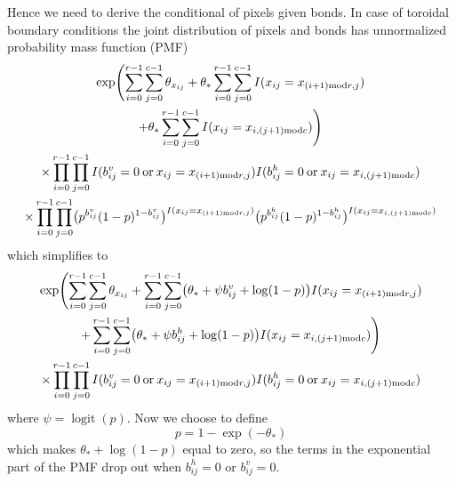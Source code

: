 \documentclass[11pt]{article}
\renewcommand{\mod}{\mathbin{\rm mod}}
\newcommand{\opor}{\mathbin{\rm or}}
\DeclareMathOperator{\logit}{logit}
\begin{document}
Hence we need to derive the conditional of pixels given bonds.  In case of
toroidal boundary conditions the joint distribution of pixels and bonds has
unnormalized probability mass function (PMF)
\begin{multline*}
   \exp\Biggl(
   \sum_{i = 0}^{r - 1}
   \sum_{j = 0}^{c - 1}
   \theta_{x_{i j}}
   +
   \theta_*
   \sum_{i = 0}^{r - 1}
   \sum_{j = 0}^{c - 1}
   I(x_{i j} = x_{(i + 1) \mod r, j})
   \\
   +
   \theta_*
   \sum_{i = 0}^{r - 1}
   \sum_{j = 0}^{c - 1}
   I(x_{i j} = x_{i, (j + 1) \mod c})
   \Biggr)
   \\
   \times
   \prod_{i = 0}^{r - 1}
   \prod_{j = 0}^{c - 1}
   I(b^v_{i j} = 0 \opor x_{i j} = x_{(i + 1) \mod r, j})
   I(b^h_{i j} = 0 \opor x_{i j} = x_{i, (j + 1) \mod c})
   \\
   \times
   \prod_{i = 0}^{r - 1}
   \prod_{j = 0}^{c - 1}
   \bigl( p^{b^v_{i j}} (1 - p)^{1 - b^v_{i j}}
   \bigr)^{I(x_{i j} = x_{(i + 1) \mod r, j})}
   \bigl( p^{b^h_{i j}} (1 - p)^{1 - b^h_{i j}}
   \bigr)^{I(x_{i j} = x_{i, (j + 1) \mod c})}
\end{multline*}
which simplifies to
\begin{multline*}
   \exp\Biggl(
   \sum_{i = 0}^{r - 1}
   \sum_{j = 0}^{c - 1}
   \theta_{x_{i j}}
   +
   \sum_{i = 0}^{r - 1}
   \sum_{j = 0}^{c - 1}
   \bigl( \theta_* + \psi b^v_{i j} + \log(1 - p) \bigr)
   I(x_{i j} = x_{(i + 1) \mod r, j})
   \\
   +
   \sum_{i = 0}^{r - 1}
   \sum_{j = 0}^{c - 1}
   \bigl( \theta_* + \psi b^h_{i j} + \log(1 - p) \bigr)
   I(x_{i j} = x_{i, (j + 1) \mod c})
   \Biggr)
   \\
   \times
   \prod_{i = 0}^{r - 1}
   \prod_{j = 0}^{c - 1}
   I(b^v_{i j} = 0 \opor x_{i j} = x_{(i + 1) \mod r, j})
   I(b^h_{i j} = 0 \opor x_{i j} = x_{i, (j + 1) \mod c})
\end{multline*}
where $\psi = \logit(p)$.  Now we choose to define
$$
   p = 1 - \exp(- \theta_*)
$$
which makes $\theta_* + \log(1 - p)$ equal to zero, so the terms in the
exponential part of the PMF drop out
when $b^h_{i j} = 0$ or $b^v_{i j} = 0$.
\end{document}
